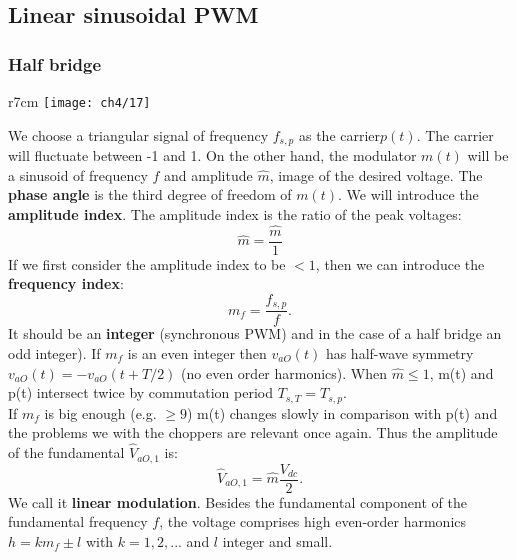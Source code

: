 	\subsection{Linear sinusoidal PWM}
		\subsubsection{Half bridge}
			\begin{wrapfigure}[14]{r}{7cm}
			\vspace{-5mm}
			\texttt{[image: ch4/17]}
			\end{wrapfigure}
			We choose a triangular signal of frequency $f_{s,p}$ as the carrier$p(t)$. The carrier will fluctuate between -1 and 1. On the other hand, the modulator $m(t)$ will be a sinusoid of frequency $f$ and amplitude $\hat{m}$, image of the desired voltage. The \textbf{phase angle} is the third degree of freedom of $m(t)$. We will introduce the \textbf{amplitude index}. The amplitude index is the ratio of the peak voltages:
			\begin{equation}
				\hat{m} = \frac{\hat{m}}{1}
			\end{equation}
			If we first consider the amplitude index to be $<1$, then we can introduce the \textbf{frequency index}: 
			\begin{equation}
				m_f = \frac{f_{s,p}}{f}.
			\end{equation}
			It should be an \textbf{integer} (synchronous PWM) and in the case of a half bridge an odd integer). If $m_f$ is an even integer then $v_{aO}(t)$ has half-wave symmetry $v_{aO}(t) = - v_{aO}(t+T/2)$ (no even order harmonics). When $\hat{m}\leq 1$, m(t) and p(t) intersect twice by commutation period $T_{s,T} = T_{s,p}$.\\
			
			 If $m_f$ is big enough (e.g. $\geq 9$) m(t) changes slowly in comparison with p(t) and the problems we with the choppers are relevant once again. Thus the amplitude of the fundamental $\hat{V}_{aO,1}$ is: 
			 \begin{equation}
			 	\hat{V}_{aO,1} = \hat{m}\frac{V_{dc}}{2}.
			 \end{equation}
			 We call it \textbf{linear modulation}. Besides the fundamental component of the fundamental frequency $f$, the voltage comprises high even-order harmonics $h = km_f \pm l$ with $k=1,2,...$ and $l$ integer and small. 
			

